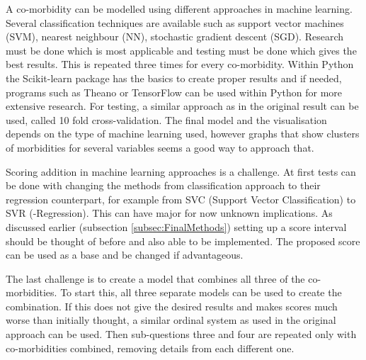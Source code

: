 \documentclass[10pt,a4paper]{article}
\begin{document}
	A co-morbidity can be modelled using different approaches in machine learning. Several classification techniques are available such as support vector machines (SVM), nearest neighbour (NN), stochastic gradient descent (SGD). Research must be done which is most applicable and testing must be done which gives the best results. This is repeated three times for every co-morbidity. Within Python the Scikit-learn package has the basics to create proper results and if needed, programs such as Theano or TensorFlow can be used within Python for more extensive research. For testing, a similar approach as in the original result can be used, called 10 fold cross-validation. The final model and the visualisation depends on the type of machine learning used, however graphs that show clusters of morbidities for several variables seems a good way to approach that.
	
	Scoring addition in machine learning approaches is a challenge. At first tests can be done with changing the methods from classification approach to their regression counterpart, for example from SVC (Support Vector Classification) to SVR (-Regression). This can have major for now unknown implications. As discussed earlier (subsection \ref{subsec:FinalMethods}) setting up a score interval should be thought of before and also able to be implemented. The proposed score can be used as a base and be changed if advantageous.
	
	The last challenge is to create a model that combines all three of the co-morbidities. To start this, all three separate models can be used to create the combination. If this does not give the desired results and makes scores much worse than initially thought, a similar ordinal system as used in the original approach can be used. Then sub-questions three and four are repeated only with co-morbidities combined, removing details from each different one.
	
	 
	
	
\end{document}
